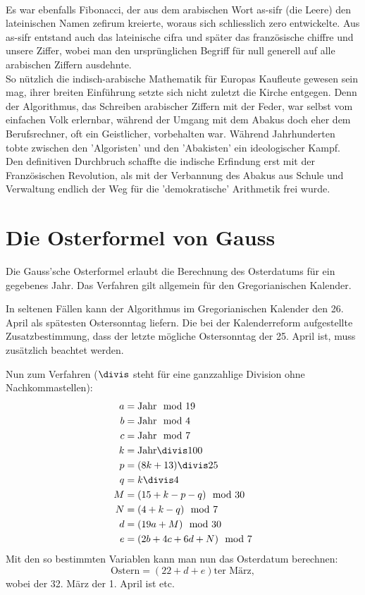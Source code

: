 \documentclass[%
11pt,%
twoside,%
titlepage,%
german,%
headsepline%
]{scrartcl}
\begin{document}
\begin{multicols}{2}
\\
Es war ebenfalls Fibonacci, der aus dem arabischen Wort as-sifr (die Leere) den lateinischen Namen zefirum kreierte, woraus sich schliesslich zero entwickelte. Aus as-sifr entstand auch das lateinische cifra und später das französische chiffre und unsere Ziffer, wobei man den ursprünglichen Begriff für null generell auf alle arabischen Ziffern ausdehnte.
\\[5mm]
So nützlich die indisch-arabische Mathematik für Europas Kaufleute gewesen sein mag, ihrer breiten Einführung setzte sich nicht zuletzt die Kirche entgegen. Denn der Algorithmus, das Schreiben arabischer Ziffern mit der Feder, war selbst vom einfachen Volk erlernbar, während der Umgang mit dem Abakus doch eher dem Berufsrechner, oft ein Geistlicher, vorbehalten war. Während Jahrhunderten tobte zwischen den 'Algoristen' und den 'Abakisten' ein ideologischer Kampf. Den definitiven Durchbruch schaffte die indische Erfindung erst mit der Französischen Revolution, als mit der Verbannung des Abakus aus Schule und Verwaltung endlich der Weg für die 'demokratische' Arithmetik frei wurde.
\end{multicols}

\section{Die Osterformel von Gauss}

Die Gauss'sche Osterformel
erlaubt die Berechnung des Osterdatums für ein gegebenes Jahr. Das Verfahren gilt allgemein für den Gregorianischen Kalender.

\begin{bem}
In seltenen Fällen kann der Algorithmus im Gregorianischen Kalender den 26. April als spätesten Ostersonntag liefern. Die bei der Kalenderreform aufgestellte Zusatzbestimmung, dass der letzte mögliche Ostersonntag der 25. April ist, muss zusätzlich beachtet werden.
\end{bem}

Nun zum Verfahren ($\divis$ steht für eine ganzzahlige Division ohne Nachkommastellen):
\begin{align*}
a &= \text{Jahr}\mod19\\
b &= \text{Jahr}\mod4\\
c &= \text{Jahr}\mod7\\
k &= \text{Jahr}\divis100\\
p &= (8k+13)\divis25\\
q &= k\divis4\\
M &= (15+k-p-q)\mod30\\
N &= (4+k-q)\mod7\\
d &= (19a+M)\mod30\\
e &= (2b+4c+6d+N)\mod7
\end{align*}
Mit den so bestimmten Variablen kann man nun das Osterdatum berechnen:
$$\text{Ostern}=(22+d+e)\text{ter März},$$
wobei der 32. März der 1. April ist etc.
\end{document}
